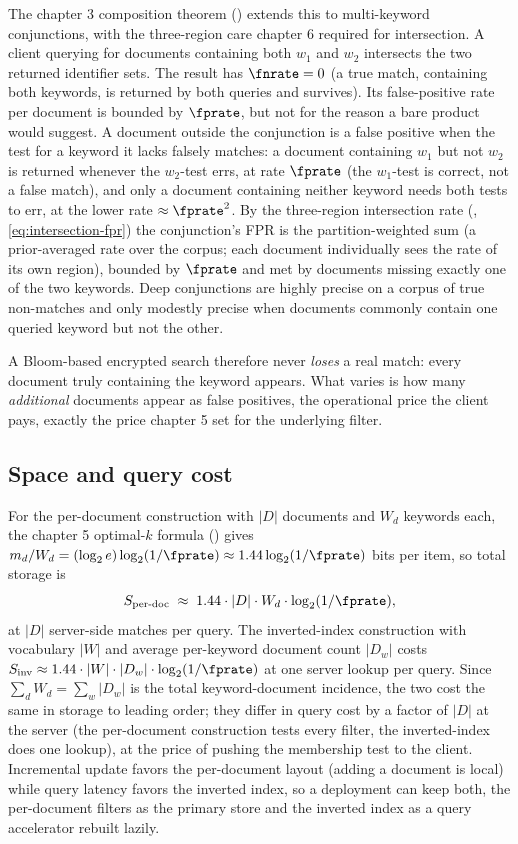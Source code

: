 The chapter 3 composition theorem () extends this
to multi-keyword conjunctions, with the three-region care chapter 6
required for intersection. A client querying for documents containing
both $w_1$ and $w_2$ intersects the two returned identifier sets. The
result has $\fnrate = 0$ (a true match, containing both keywords, is
returned by both queries and survives). Its false-positive rate per
document is bounded by $\fprate$, but not for the reason a bare product
would suggest. A document outside the conjunction is a false positive
when the test for a keyword it lacks falsely matches: a document
containing $w_1$ but not $w_2$ is returned whenever the $w_2$-test errs,
at rate $\fprate$ (the $w_1$-test is correct, not a false match), and only
a document containing neither keyword needs both tests to err, at the
lower rate $\approx \fprate^2$. By the three-region intersection rate
(, \eqref{eq:intersection-fpr}) the
conjunction's FPR is the partition-weighted sum (a prior-averaged rate
over the corpus; each document individually sees the rate of its own
region), bounded by $\fprate$ and
met by documents missing exactly one of the two keywords. Deep
conjunctions are highly precise on a corpus of true non-matches and only
modestly precise when documents commonly contain one queried keyword but
not the other.

A Bloom-based encrypted search therefore never \emph{loses} a real match:
every document truly containing the keyword appears. What varies is how
many \emph{additional} documents appear as false positives, the
operational price the client pays, exactly the price chapter 5 set for
the underlying filter.

\subsection*{Space and query cost}

For the per-document construction with $|D|$ documents and $W_d$ keywords
each, the chapter 5 optimal-$k$ formula () gives
$m_d / W_d = (\log_2 e)\log_2(1/\fprate) \approx 1.44 \log_2(1/\fprate)$
bits per item, so total storage is
\[
  S_{\text{per-doc}} \;\approx\; 1.44 \cdot |D| \cdot W_d \cdot
  \log_2(1/\fprate),
\]
at $|D|$ server-side matches per query. The inverted-index construction
with vocabulary $|W|$ and average per-keyword document count $|D_w|$ costs
$S_{\text{inv}} \approx 1.44 \cdot |W| \cdot |D_w| \cdot \log_2(1/\fprate)$
at one server lookup per query. Since $\sum_d W_d = \sum_w |D_w|$ is the
total keyword-document incidence, the two cost the same in storage to
leading order; they differ in query cost by a factor of $|D|$ at the
server (the per-document construction tests every filter, the
inverted-index does one lookup), at the price of pushing the membership
test to the client. Incremental update favors the per-document layout
(adding a document is local) while query latency favors the inverted
index, so a deployment can keep both, the per-document filters as the primary
store and the inverted index as a query accelerator rebuilt lazily.

